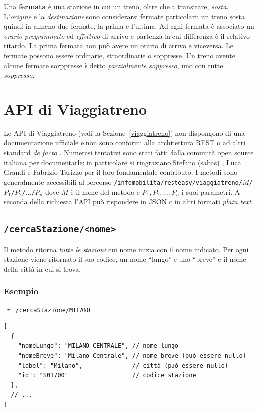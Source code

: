 \documentclass[12pt,italian]{report}
\begin{document}
Una \textbf{fermata} è una stazione in cui un treno, oltre che a
transitare, \textit{sosta}.  L'\textit{origine} e la
\textit{destinazione} sono considerarsi fermate particolari: un treno
sosta quindi in almeno due fermate, la prima e l'ultima.  Ad ogni
fermata è associato un \textit{orario programmato} ed
\textit{effettivo} di arrivo e partenza la cui differenza è il
relativo ritardo.  La prima fermata non può avere un orario di arrivo
e viceversa.  Le fermate possono essere ordinarie, straordinarie o
soppresse.  Un treno avente alcune fermate sorppresse è detto
\textit{parzialmente soppresso}, uno con tutte \textit{soppresso}.

\section{API di Viaggiatreno}

Le API di Viaggiatreno (vedi la Sezione~\ref{viaggiatreno}) non
dispongono di una documentazione ufficiale e non sono conformi alla
architettura REST o ad altri standard \textit{de facto} \cite{Giunta}.
Numerosi tentativi sono stati fatti dalla comunità open source
italiana per documentarle: in particolare si ringraziano Stefano
(sabas) \cite{Sabas}, Luca Grandi \cite{Grandi} e Fabrizio Tarizzo
\cite{Tarizzo} per il loro fondamentale contributo.  I metodi sono
generalmente accessibili al percorso
\texttt{/infomobilita/\-resteasy/\-viaggiatreno/\-$M$/\-$P_1$/\-$P_2$/\-$\dots$/\-$P_n$}
dove $M$ è il nome del metodo e $P_1, P_2, \dots, P_n$ i suoi
parametri. A seconda della richiesta l'API può rispondere in JSON o in
altri formati \textit{plain text}.


\subsection{\texttt{/cercaStazione/<nome>}}
\label{cercaStazione}

Il metodo ritorna \textit{tutte le stazioni} cui nome inizia con il
nome indicato.  Per ogni stazione viene ritornato il suo codice, un
nome ``lungo'' e uno ``breve'' e il nome della città in cui si trova.

\subsubsection{Esempio}

$\Rsh$ \texttt{/cercaStazione/MILANO}
\begin{verbatim}
[
  {
    "nomeLungo": "MILANO CENTRALE", // nome lungo
    "nomeBreve": "Milano Centrale", // nome breve (può essere nullo)
    "label": "Milano",              // città (può essere nullo)
    "id": "S01700"                  // codice stazione
  },
  // ...
]
\end{verbatim}
\end{document}
